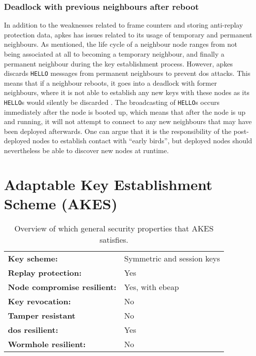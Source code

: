 \subsubsection{Deadlock with previous neighbours after reboot}

In addition to the weaknesses related to frame counters and storing anti-replay protection data, \gls{apkes} has issues related to its usage of temporary and permanent neighbours. As mentioned, the life cycle of a neighbour node ranges from not being associated at all to becoming a temporary neighbour, and finally a permanent neighbour during the key establishment process. However, \gls{apkes} discards \texttt{HELLO} messages from permanent neighbours to prevent \gls{dos} attacks. This means that if a neighbour reboots, it goes into a deadlock with former neighbours, where it is not able to establish any new keys with these nodes as its \texttt{HELLO}s would silently be discarded \cite{krentz2015handling}. The broadcasting of \texttt{HELLO}s occurs immediately after the node is booted up, which means that after the node is up and running, it will not attempt to connect to any new neighbours that may have been deployed afterwards. One can argue that it is the responsibility of the post-deployed nodes to establish contact with ``early birds'', but deployed nodes should nevertheless be able to discover new nodes at runtime. 




\section{Adaptable Key Establishment Scheme (AKES)}


\begin{table}[h]
\centering
\begin{tabular}{|l|l|} \hline
\textbf{Key scheme:} & Symmetric and session keys  \\
\textbf{Replay protection:}	 & Yes  \\
\textbf{Node compromise resilient:} & Yes, with \gls{ebeap}  \\
\textbf{Key revocation:} & No \\
\textbf{Tamper resistant} & No \\
\textbf{\gls{dos} resilient:} & Yes \\
\textbf{Wormhole resilient:} & No \\ \hline
\end{tabular}
\caption{Overview of which general security properties that AKES satisfies.}
\label{tab:akes-props}
\end{table}


